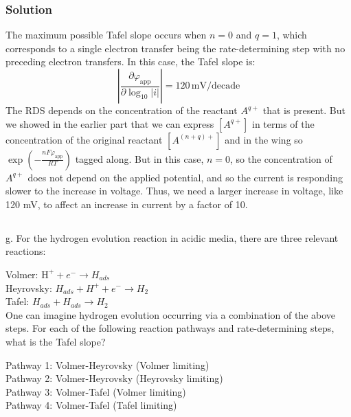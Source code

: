 \documentclass[12pt]{article}
\begin{document}
\subsubsection{Solution}
The maximum possible Tafel slope occurs when $n = 0$ and $q = 1$, which corresponds to a single electron transfer being the rate-determining step with no preceding electron transfers. In this case, the Tafel slope is:
\begin{equation}
\left| \frac{\partial \varphi_{\text{app}}}{\partial \log_{10}|i|} \right| = 120 \, \text{mV/decade}
\end{equation}
The RDS depends on the concentration of the reactant $A^{q+}$ that is present. But we showed in the earlier part that we can express $[A^{q+}]$ in terms of the concentration of the original reactant $[A^{(n+q)+}]$ and in the wing so $\exp \left( -\frac{n F \varphi_{\text{app}}}{RT} \right)$ tagged along. But in this case, $n=0$, so the concentration of $A^{q+}$ does not depend on the applied potential, and so the current is responding slower to the increase in voltage. Thus, we need a larger increase in voltage, like 120 mV, to affect an increase in current by a factor of 10.
\subsection{}
g. For the hydrogen evolution reaction in acidic media, there are three relevant reactions:

Volmer: $\mathrm{H}^{+}+e^{-} \rightarrow H_{a d s}$\\
Heyrovsky: $H_{a d s}+H^{+}+e^{-} \rightarrow H_{2}$\\
Tafel: $H_{a d s}+H_{a d s} \rightarrow H_{2}$\\
One can imagine hydrogen evolution occurring via a combination of the above steps. For each of the following reaction pathways and rate-determining steps, what is the Tafel slope?

Pathway 1: Volmer-Heyrovsky (Volmer limiting)\\
Pathway 2: Volmer-Heyrovsky (Heyrovsky limiting)\\
Pathway 3: Volmer-Tafel (Volmer limiting)\\
Pathway 4: Volmer-Tafel (Tafel limiting)
\end{document}
